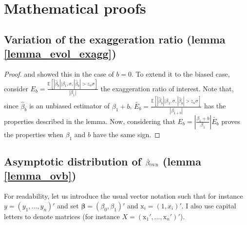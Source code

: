 \documentclass[usletter, 12pt]{article}
\begin{document}


		
	
\newpage
	



\newpage

\appendix

	\section{Mathematical proofs}\label{maths_proofs}
	

		\subsection{Variation of the exaggeration ratio (lemma \ref{lemma_evol_exagg})}
			
			\begin{proof}
				\cite{lu_note_2019} and \cite{zwet_significance_2021} showed this in the case of $b = 0$. 
				To extend it to the biased case, consider 
				$E_{b} = \frac{\mathbb{E}\left[ |\hat{\beta}_{b}| \big| \beta_{1}, \sigma, |\hat{\beta}_{b}| > z_{\alpha} \sigma \right]}{|\beta_{1}|}$ the exaggeration ratio of interest. 
				Note that, since $\hat{\beta}_{b}$ is an unbiased estimator of $\beta_{1} + b$, $\tilde{E_{b}} = \frac{\mathbb{E}\left[ |\hat{\beta}_{b}| \big| \beta_{1}, \sigma, |\hat{\beta}_{b}| > z_{\alpha} \sigma \right]}{|\beta_{1 + b}|}$ has the properties described in the lemma. 
				Now, considering that $E_{b} = \left| \frac{\beta_{1} + b}{\beta_{1}} \right| \tilde{E_{b}}$ proves the properties when $\beta_{1}$ and $b$ have the same sign.
			\end{proof}
	

\subsection{Asymptotic distribution of $\hat{\beta}_{\textsc{ovb}}$ (lemma \ref{lemma_ovb})}
			
			For readability, let us introduce the usual vector notation such that for instance $y = (y_1, ..., y_n)'$ and set $\bm{\beta} = (\beta_0, \beta_1)'$ and $\text{x}_i = (1, x_i)'$. I also use capital letters to denote matrices (for instance $X = (\text{x}_{1}', ..., \text{x}_{n}')'$).\\
			
\end{document}
